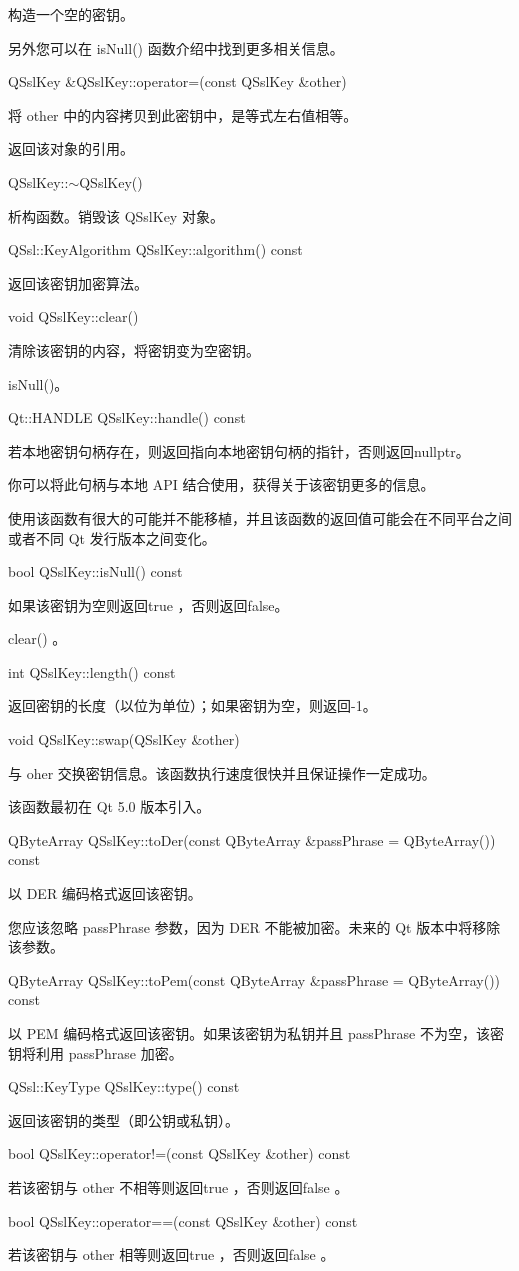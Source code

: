 构造一个空的密钥。

另外您可以在 isNull() 函数介绍中找到更多相关信息。

QSslKey \&QSslKey::operator=(const QSslKey \&other)

将 other 中的内容拷贝到此密钥中，是等式左右值相等。

返回该对象的引用。

QSslKey::$\sim$QSslKey()

析构函数。销毁该 QSslKey 对象。

QSsl::KeyAlgorithm QSslKey::algorithm() const

返回该密钥加密算法。

void QSslKey::clear()

清除该密钥的内容，将密钥变为空密钥。

\begin{seeAlso}
isNull()。
\end{seeAlso}

Qt::HANDLE QSslKey::handle() const

若本地密钥句柄存在，则返回指向本地密钥句柄的指针，否则返回nullptr。

你可以将此句柄与本地 API 结合使用，获得关于该密钥更多的信息。

\begin{warning}
使用该函数有很大的可能并不能移植，并且该函数的返回值可能会在不同平台之间或者不同 Qt 发行版本之间变化。
\end{warning}

bool QSslKey::isNull() const

如果该密钥为空则返回true ，否则返回false。

\begin{seeAlso}
clear() 。
\end{seeAlso}

int QSslKey::length() const

返回密钥的长度（以位为单位）；如果密钥为空，则返回-1。

void QSslKey::swap(QSslKey \&other)

与 oher 交换密钥信息。该函数执行速度很快并且保证操作一定成功。

该函数最初在 Qt 5.0 版本引入。

QByteArray QSslKey::toDer(const QByteArray \&passPhrase = QByteArray()) const

以 DER 编码格式返回该密钥。

您应该忽略 passPhrase 参数，因为 DER 不能被加密。未来的 Qt 版本中将移除该参数。

QByteArray QSslKey::toPem(const QByteArray \&passPhrase = QByteArray()) const

以 PEM 编码格式返回该密钥。如果该密钥为私钥并且 passPhrase 不为空，该密钥将利用 passPhrase 加密。

QSsl::KeyType QSslKey::type() const

返回该密钥的类型（即公钥或私钥）。

bool QSslKey::operator!=(const QSslKey \&other) const

若该密钥与 other 不相等则返回true ，否则返回false 。

bool QSslKey::operator==(const QSslKey \&other) const

若该密钥与 other 相等则返回true ，否则返回false 。